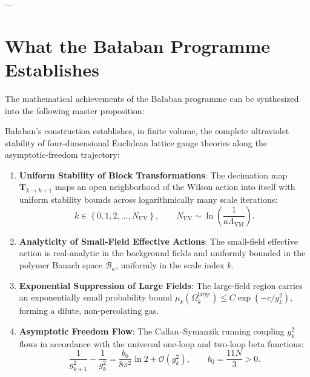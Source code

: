 ---

\section{What the Ba\l aban Programme Establishes}
\label{sec:what_balaban_established}

The mathematical achievements of the Ba\l aban programme can be synthesized into the following master proposition:

\begin{proposition}
\label{prop:balaban_achievements}
Ba\l aban's construction establishes, in finite volume, the complete ultraviolet stability of four-dimensional Euclidean lattice gauge theories along the asymptotic-freedom trajectory:
\begin{enumerate}
    \item \textbf{Uniform Stability of Block Transformations}: The decimation map $\mathbf{T}_{k \to k+1}$ maps an open neighborhood of the Wilson action into itself with uniform stability bounds across logarithmically many scale iterations:
    \begin{equation}
    k \in \left\{ 0, 1, 2, \dots, N_{\mathrm{UV}} \right\}, \qquad N_{\mathrm{UV}} \sim \ln\left( \frac{1}{a \Lambda_{\mathrm{YM}}} \right).
    \end{equation}
    \item \textbf{Analyticity of Small-Field Effective Actions}: The small-field effective action is real-analytic in the background fields and uniformly bounded in the polymer Banach space $\mathcal{B}_\kappa$, uniformly in the scale index $k$.
    \item \textbf{Exponential Suppression of Large Fields}: The large-field region carries an exponentially small probability bound $\mu_k(\Omega_k^{\mathrm{large}}) \le C \exp(-c / g_k^2)$, forming a dilute, non-percolating gas.
    \item \textbf{Asymptotic Freedom Flow}: The Callan--Symanzik running coupling $g_k^2$ flows in accordance with the universal one-loop and two-loop beta functions:
    \begin{equation}
    \frac{1}{g_{k+1}^2} - \frac{1}{g_k^2} = \frac{b_0}{8\pi^2} \ln 2 + \mathcal{O}(g_k^2), \qquad b_0 = \frac{11 N}{3} > 0.
    \end{equation}
\end{enumerate}
\end{proposition}

